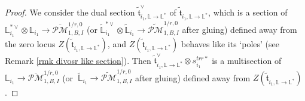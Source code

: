 \documentclass[11pt]{amsart}
\theoremstyle{definition}
\theoremstyle{remark}
\newcommand{\oPMb}{{\overline{\mathcal{PM}}}}
\newcommand{\nontilde}{}
\newcommand{\<}{\left<}
\renewcommand{\>}{\right>}
\numberwithin{equation}{section}
\begin{document}
\begin{proof}
        We consider the dual section $\tilde{\mathfrak{t}}^{\vee}_{i_1,\mathbb L \to \mathbb L^*}$ of $\tilde{\mathfrak{t}}_{i_1,\mathbb L \to \mathbb L^*}$, which is a section  of  ${\mathbb L}^{*\vee}_{i_1}\otimes {\mathbb L}_{i_1}\to  \oPMb^{1/r,0}_{1,B,I}$ (or $\widetilde{\mathbb L}^{*\vee}_{i_1}\otimes \widetilde{\mathbb L}_{i_1} \to \widetilde{\mathcal{PM}}^{1/r,0}_{1,B,I}$ after gluing) defined away from the zero locus $Z(\tilde{\mathfrak{t}}_{i_1,\mathbb L \to \mathbb L^*})$, and $Z(\tilde{\mathfrak{t}}_{i_1,\mathbb L \to \mathbb L^*})$ behaves like its `poles' (see Remark \ref{rmk divosr like section}). Then $\tilde{\mathfrak{t}}^{\vee}_{i_1,\mathbb L \to \mathbb L^*}\otimes
        \nontilde{s}^{trr*}_{i_1}$ is a multisection of  $ {\mathbb L}_{i_1}\to  \oPMb^{1/r,0}_{1,B,I}$ (or $\ \widetilde{\mathbb L}_{i_1} \to \widetilde{\mathcal{PM}}^{1/r,0}_{1,B,I}$ after gluing) defined away from $Z(\tilde{\mathfrak{t}}_{i_1,\mathbb L \to \mathbb L^*})$.


\end{proof}
\end{document}
